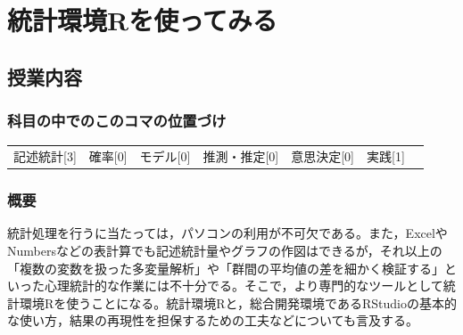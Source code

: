 \section{統計環境Rを使ってみる}
\label{lesson05}

\subsection{授業内容}
\subsubsection{科目の中でのこのコマの位置づけ}
\begin{tabular}[t]{ccccccc}
    記述統計[3] & 確率[0] & モデル[0] & 推測・推定[0] & 意思決定[0] & 実践[1]
\end{tabular}
\subsubsection{概要}
統計処理を行うに当たっては，パソコンの利用が不可欠である。また，ExcelやNumbersなどの表計算でも記述統計量やグラフの作図はできるが，それ以上の「複数の変数を扱った多変量解析」や「群間の平均値の差を細かく検証する」といった心理統計的な作業には不十分でる。そこで，より専門的なツールとして統計環境Rを使うことになる。統計環境Rと，総合開発環境であるRStudioの基本的な使い方，結果の再現性を担保するための工夫などについても言及する。
